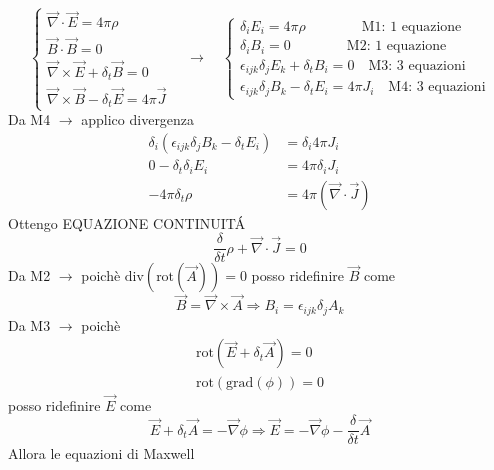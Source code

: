 \documentclass[a4paper,11pt]{report}
\theoremstyle{remark}
\theoremstyle{definition}
\newcommand{\rot}{\mbox{rot}}
\newcommand{\grad}{\mbox{grad}}
\newcommand{\Div}{\mbox{div}}
\begin{document}
\begin{equation*}
    \begin{cases}
        \vec{\nabla} \cdot \vec{E} = 4\pi\rho \\
        \vec{B} \cdot \vec{B} = 0 \\
        \vec{\nabla} \times \vec{E} + \delta_t \vec{B} = 0 \\
        \vec{\nabla} \times \vec{B} - \delta_t \vec{E} = 4 \pi \vec{J}
    \end{cases} \quad \rightarrow \quad 
    \begin{cases}
        \delta_iE_i = 4\pi \rho  \qquad \qquad \text{M1: 1 equazione}\\
        \delta_iB_i = 0  \qquad \qquad \text{M2: 1 equazione}\\
        \epsilon_{ijk} \delta_jE_k + \delta_t B_i = 0 \quad \text{M3: 3 equazioni}\\
        \epsilon_{ijk} \delta_jB_k - \delta_t E_i = 4 \pi J_i \quad \text{M4: 3 equazioni}
    \end{cases}
\end{equation*}
Da M4 $\rightarrow$ applico divergenza
\begin{align*}
    \delta_i (\epsilon_{ijk} \delta_jB_k - \delta_t E_i) &= \delta_i 4 \pi J_i \\
    0 - \delta_t\delta_iE_i &= 4\pi \delta_iJ_i \\
    - 4\pi \delta_t\rho &= 4\pi (\vec{\nabla}\cdot \vec{J}) 
\end{align*}
Ottengo EQUAZIONE CONTINUIT\'A 
\begin{equation*}
    \frac{\delta}{\delta t}\rho + \vec{\nabla} \cdot \vec{J} = 0
\end{equation*}
Da M2 $\rightarrow$ poichè $\Div(\rot(\vec{A})) = 0$ posso ridefinire $\vec{B}$ come
\begin{equation*}
    \vec{B} = \vec{\nabla} \times \vec{A} \Rightarrow B_i = \epsilon_{ijk} \delta_j A_k
\end{equation*}
Da M3 $\rightarrow$ poichè
\begin{eqnarray*}
    \rot(\vec{E} + \delta_t \vec{A}) = 0 \\
    \rot(\grad(\phi)) = 0
\end{eqnarray*}
posso ridefinire $\vec{E}$ come
\begin{equation*}
    \vec{E} + \delta_t \vec{A} = -\vec{\nabla}\phi \Rightarrow \vec{E} = - \vec{\nabla} \phi - \frac{\delta}{\delta t} \vec{A}
\end{equation*}
Allora le equazioni di Maxwell
\end{document}
